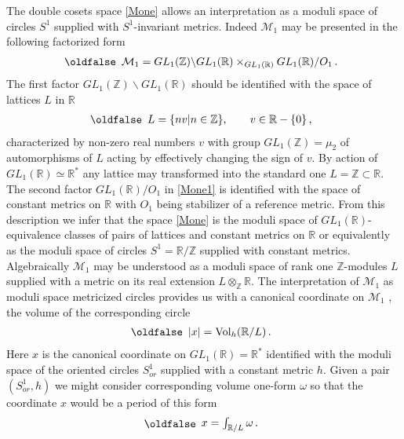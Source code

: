 \documentclass[12pt]{article}
\def\IR{\mathbb{R}}
\def\IZ{\mathbb{Z}}
\def\CM {\mathcal{M}}
\def\be{\begin{eqnarray}\new\begin{array}{cc}}
\def\ee{\end{array}\end{eqnarray}}
\newcounter{pac}[section]
\begin{document}
The  double cosets space  \eqref{Mone} allows an interpretation as   a
moduli  space of circles $S^1$ supplied with  $S^1$-invariant
metrics. Indeed $\CM_1$ may be presented in the following factorized form
\be\label{Mone1}
\CM_1=GL_1(\IZ)\backslash GL_1(\IR)\times_{GL_1(\IR)} GL_1(\IR)/O_1\,.
\ee
The first factor $GL_1(\IZ)\backslash GL_1(\IR)$ should be identified with
the space of lattices $L$ in $\IR$
\be
L=\{  nv|n\in \IZ\}, \qquad v\in \IR-\{0\}\,,
\ee
characterized by  non-zero real numbers $v$ with group
$GL_1(\IZ)=\mu_2$ of automorphisms of $L$ acting by effectively
changing the sign of $v$. By action of $GL_1(\IR)\simeq \IR^*$ any
lattice may transformed   into the standard one $L=\IZ\subset \IR$.
The second factor $GL_1(\IR)/O_1$ in \eqref{Mone1}
is identified with the  space of constant
metrics on $\IR$ with  $O_1$ being
stabilizer of a reference metric.  From this description we  infer that
the space \eqref{Mone} is  the moduli space of
 $GL_1(\IR)$-equivalence classes of  pairs of lattices  and constant metrics
on $\IR$ or equivalently as the moduli space of circles $S^1=\IR/\IZ$ supplied with
constant metrics. Algebraically $\CM_1$ may be understood as a moduli
space of rank one $\IZ$-modules $L$ supplied with a metric on its real
extension $L\otimes_\IZ \IR$.  The interpretation of $\CM_1$ as moduli
space metricized circles  provides us with a canonical
coordinate on $\CM_1$ , the volume of the corresponding circle
\be\label{VolC}
|x|={\rm Vol}_h(\IR/L)\,.
\ee
Here $x$ is the canonical coordinate on $GL_1(\IR)=\IR^*$ identified
with the moduli space of the oriented circles $S^1_{or}$ supplied with a constant
metric $h$. Given  a pair $(S^1_{or},h)$
we might consider corresponding volume one-form $\omega$ so that
the coordinate $x$ would be a period of this form
\be\label{VolC1}
x=\int_{\IR/L}\omega\,.
\ee
\end{document}
